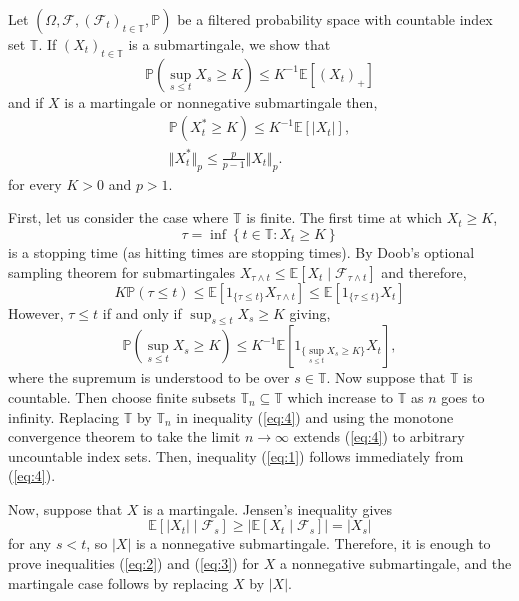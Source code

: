 \documentclass[12pt]{article}
\begin{document}

Let $(\Omega,\mathcal{F},(\mathcal{F}_t)_{t\in\mathbb{T}},\mathbb{P})$ be a filtered probability space with countable index set $\mathbb{T}$.
If $(X_t)_{t\in\mathbb{T}}$ is a submartingale, we show that
\begin{equation}\label{eq:1}
\mathbb{P}\left(\sup_{s\le t}X_s\ge K\right)\le K^{-1}\mathbb{E}[(X_t)_+]
\end{equation}
and if $X$ is a martingale or nonnegative submartingale then,
\begin{gather}
\label{eq:2}\mathbb{P}(X^*_t\ge K)\le K^{-1}\mathbb{E}[|X_t|],\\
\label{eq:3}\Vert X^*_t\Vert_p\le \frac{p}{p-1}\Vert X_t\Vert_p. 
\end{gather}
for every $K>0$ and $p>1$.

First, let us consider the case where $\mathbb{T}$ is finite. The first time at which $X_t\ge K$,
\begin{equation*}
\tau=\inf\left\{t\in\mathbb{T}:X_t\ge K\right\}
\end{equation*}
is a stopping time (as hitting times are stopping times). By Doob's optional sampling theorem for submartingales $X_{\tau\wedge t}\le\mathbb{E}[X_t\mid\mathcal{F}_{\tau\wedge t}]$ and therefore,
\begin{equation*}
K\mathbb{P}(\tau\le t)
\le\mathbb{E}[1_{\{\tau\le t\}}X_{\tau\wedge t}]
\le\mathbb{E}[1_{\{\tau\le t\}}X_{t}]
\end{equation*}
However, $\tau\le t$ if and only if $\sup_{s\le t}X_s\ge K$ giving,
\begin{equation}\label{eq:4}
\mathbb{P}\left(\sup_{s\le t}X_s\ge K\right)\le K^{-1}\mathbb{E}[1_{\{\sup_{s\le t}X_s\ge K\}}X_t],
\end{equation}
where the supremum is understood to be over $s\in\mathbb{T}$.
Now suppose that $\mathbb{T}$ is countable. Then choose finite subsets $\mathbb{T}_n\subseteq\mathbb{T}$ which increase to $\mathbb{T}$ as $n$ goes to infinity. Replacing $\mathbb{T}$ by $\mathbb{T}_n$ in inequality (\ref{eq:4}) and using the monotone convergence theorem to take the limit $n\rightarrow\infty$ extends (\ref{eq:4}) to arbitrary uncountable index sets. Then, inequality (\ref{eq:1}) follows immediately from (\ref{eq:4}).

Now, suppose that $X$ is a martingale. Jensen's inequality gives
\begin{equation*}
\mathbb{E}[|X_t|\mid\mathcal{F}_s]\ge \left|\mathbb{E}[X_t\mid\mathcal{F}_s]\right|=|X_s|
\end{equation*}
for any $s<t$, so $|X|$ is a nonnegative submartingale. Therefore, it is enough to prove inequalities (\ref{eq:2}) and (\ref{eq:3}) for $X$ a nonnegative submartingale, and the martingale case follows by replacing $X$ by $|X|$.
\end{document}
